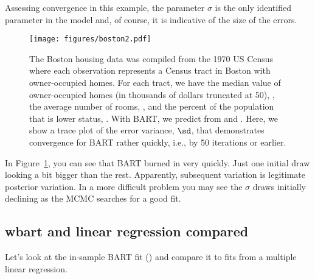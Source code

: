 \documentclass[article]{jss}
\begin{document}
Assessing convergence in this example, the parameter $\sigma$ is the
only identified parameter in the model and, of course, it is
indicative of the size of the errors.

\begin{figure}
\begin{center}
\texttt{[image: figures/boston2.pdf]}
\end{center}
\caption{\label{boston2}The Boston housing data was compiled from the
  1970 US Census where each observation represents a Census tract in
  Boston with owner-occupied homes. For each tract, we have the median
  value of owner-occupied homes (in thousands of dollars truncated at
  50), , the average number of rooms, , and
  the percent of the population that is lower status, .
  With BART, we predict  from  and .
  Here, we show a trace plot of the error variance, $\sd$, that
  demonstrates convergence for BART rather quickly, i.e., by 50
  iterations or earlier.  }
\end{figure}

In Figure~\ref{boston2}, you can see that BART burned in very quickly.  
Just one initial draw looking a bit bigger than the rest.
Apparently, subsequent variation is legitimate posterior variation.  
In a more difficult problem you may see the $\sigma$ draws initially 
declining as the MCMC searches for a good fit.

\subsection{wbart and linear regression compared}

Let's look at the in-sample BART fit ()  
and compare it to  fits from a multiple linear regression.  
\end{document}
